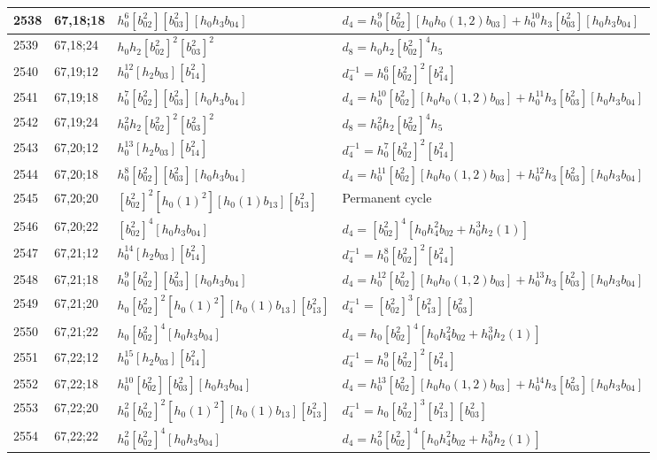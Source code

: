\documentclass{article}
\begin{document}
\begin{longtable}{|l|l|>{\raggedright\arraybackslash}p{6cm}|>{\raggedright\arraybackslash}p{6cm}|}
\hline
2538 & 67,18;18 & $h_0^6[b_{02}^2][b_{03}^2][h_0h_3b_{04}]$ &$d_{4}=h_0^9[b_{02}^2][h_0h_0(1, 2)b_{03}] + h_0^{10}h_3[b_{03}^2][h_0h_3b_{04}]$\\
\hline
2539 & 67,18;24 & $h_0h_2[b_{02}^2]^2[b_{03}^2]^2$ &$d_{8}=h_0h_2[b_{02}^2]^4h_5$\\
\hline
2540 & 67,19;12 & $h_0^{12}[h_2b_{03}][b_{14}^2]$ & $d_{4}^{-1}=h_0^6[b_{02}^2]^2[b_{14}^2]$\\
\hline
2541 & 67,19;18 & $h_0^7[b_{02}^2][b_{03}^2][h_0h_3b_{04}]$ &$d_{4}=h_0^{10}[b_{02}^2][h_0h_0(1, 2)b_{03}] + h_0^{11}h_3[b_{03}^2][h_0h_3b_{04}]$\\
\hline
2542 & 67,19;24 & $h_0^2h_2[b_{02}^2]^2[b_{03}^2]^2$ &$d_{8}=h_0^2h_2[b_{02}^2]^4h_5$\\
\hline
2543 & 67,20;12 & $h_0^{13}[h_2b_{03}][b_{14}^2]$ & $d_{4}^{-1}=h_0^7[b_{02}^2]^2[b_{14}^2]$\\
\hline
2544 & 67,20;18 & $h_0^8[b_{02}^2][b_{03}^2][h_0h_3b_{04}]$ &$d_{4}=h_0^{11}[b_{02}^2][h_0h_0(1, 2)b_{03}] + h_0^{12}h_3[b_{03}^2][h_0h_3b_{04}]$\\
\hline
2545 & 67,20;20 & $[b_{02}^2]^2[h_0(1)^2][h_0(1)b_{13}][b_{13}^2]$ & Permanent cycle\\
\hline
2546 & 67,20;22 & $[b_{02}^2]^4[h_0h_3b_{04}]$ &$d_{4}=[b_{02}^2]^4[h_0h_4^2b_{02} + h_0^3h_2(1)]$\\
\hline
2547 & 67,21;12 & $h_0^{14}[h_2b_{03}][b_{14}^2]$ & $d_{4}^{-1}=h_0^8[b_{02}^2]^2[b_{14}^2]$\\
\hline
2548 & 67,21;18 & $h_0^9[b_{02}^2][b_{03}^2][h_0h_3b_{04}]$ &$d_{4}=h_0^{12}[b_{02}^2][h_0h_0(1, 2)b_{03}] + h_0^{13}h_3[b_{03}^2][h_0h_3b_{04}]$\\
\hline
2549 & 67,21;20 & $h_0[b_{02}^2]^2[h_0(1)^2][h_0(1)b_{13}][b_{13}^2]$ & $d_{4}^{-1}=[b_{02}^2]^3[b_{13}^2][b_{03}^2]$\\
\hline
2550 & 67,21;22 & $h_0[b_{02}^2]^4[h_0h_3b_{04}]$ &$d_{4}=h_0[b_{02}^2]^4[h_0h_4^2b_{02} + h_0^3h_2(1)]$\\
\hline
2551 & 67,22;12 & $h_0^{15}[h_2b_{03}][b_{14}^2]$ & $d_{4}^{-1}=h_0^9[b_{02}^2]^2[b_{14}^2]$\\
\hline
2552 & 67,22;18 & $h_0^{10}[b_{02}^2][b_{03}^2][h_0h_3b_{04}]$ &$d_{4}=h_0^{13}[b_{02}^2][h_0h_0(1, 2)b_{03}] + h_0^{14}h_3[b_{03}^2][h_0h_3b_{04}]$\\
\hline
2553 & 67,22;20 & $h_0^2[b_{02}^2]^2[h_0(1)^2][h_0(1)b_{13}][b_{13}^2]$ & $d_{4}^{-1}=h_0[b_{02}^2]^3[b_{13}^2][b_{03}^2]$\\
\hline
2554 & 67,22;22 & $h_0^2[b_{02}^2]^4[h_0h_3b_{04}]$ &$d_{4}=h_0^2[b_{02}^2]^4[h_0h_4^2b_{02} + h_0^3h_2(1)]$\\

\end{longtable}
\end{document}
